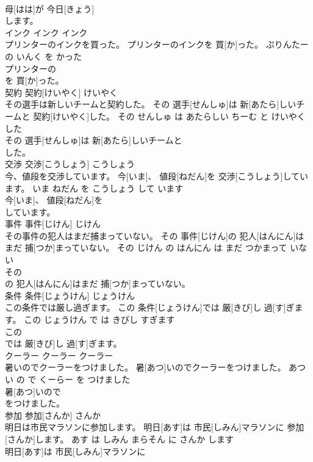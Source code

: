 \documentclass[8pt]{extreport}
\begin{document}
\begin{CJK}{UTF8}{min}
\\	母[はは]が 今日[きょう]
\\	します。			
\\	インク	インク	インク	
\\	プリンターのインクを買った。	プリンターのインクを 買[か]った。	ぷりんたー の いんく を かった	
\\	プリンターの
\\	を 買[か]った。			
\\	契約	契約[けいやく]	けいやく	
\\	その選手は新しいチームと契約した。	その 選手[せんしゅ]は 新[あたら]しいチームと 契約[けいやく]した。	その せんしゅ は あたらしい ちーむ と けいやく した	
\\	その 選手[せんしゅ]は 新[あたら]しいチームと
\\	した。			
\\	交渉	交渉[こうしょう]	こうしょう	
\\	今、値段を交渉しています。	今[いま]、 値段[ねだん]を 交渉[こうしょう]しています。	いま ねだん を こうしょう して います	
\\	今[いま]、 値段[ねだん]を
\\	しています。			
\\	事件	事件[じけん]	じけん	
\\	その事件の犯人はまだ捕まっていない。	その 事件[じけん]の 犯人[はんにん]はまだ 捕[つか]まっていない。	その じけん の はんにん は まだ つかまって いない	
\\	その
\\	の 犯人[はんにん]はまだ 捕[つか]まっていない。			
\\	条件	条件[じょうけん]	じょうけん	
\\	この条件では厳し過ぎます。	この 条件[じょうけん]では 厳[きび]し 過[す]ぎます。	この じょうけん で は きびし すぎます	
\\	この
\\	では 厳[きび]し 過[す]ぎます。			
\\	クーラー	クーラー	クーラー	
\\	暑いのでクーラーをつけました。	暑[あつ]いのでクーラーをつけました。	あつい の で くーらー を つけました	
\\	暑[あつ]いので
\\	をつけました。			
\\	参加	参加[さんか]	さんか	
\\	明日は市民マラソンに参加します。	明日[あす]は 市民[しみん]マラソンに 参加[さんか]します。	あす は しみん まらそん に さんか します	
\\	明日[あす]は 市民[しみん]マラソンに

\end{CJK}
\end{document}
